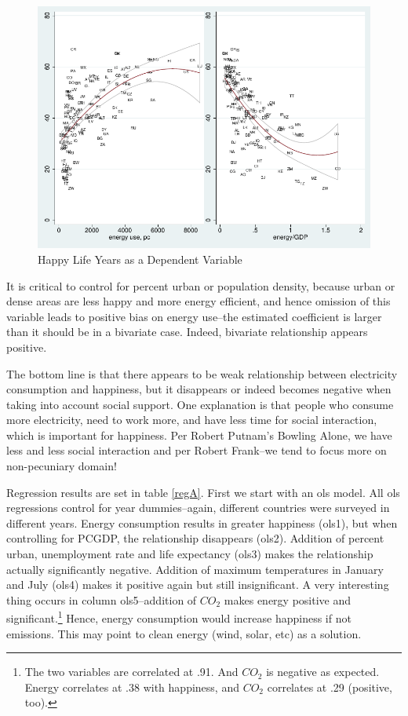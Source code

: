 \documentclass[10pt, letterpaper]{article}
\begin{document}
\begin{spacing}{1.4}
\begin{figure}[H]
 \includegraphics[width=6in]{graphsAndTables/couWdhEneGdpHly.pdf}\centering
\caption{Happy Life Years as a Dependent Variable}\label{hly}
\end{figure}

It is critical to control for percent urban or population density, because
urban or dense areas are less happy and more energy efficient, and hence
omission of this variable leads to positive bias on energy use--the estimated
coefficient   is larger than it should be in a bivariate case. Indeed, bivariate
relationship appears positive. 

The bottom line is that there appears to be weak relationship between electricity
consumption and happiness, but it disappears or indeed becomes negative when
taking into account social support. One explanation is that people who consume
more electricity, need to work more, and have less time for social interaction, which
is important for happiness. Per Robert Putnam's Bowling Alone, we have less and
less social interaction and per Robert Frank--we tend to  focus more on non-pecuniary domain!

Regression results are set in table \ref{regA}. First we start with an ols
model. All ols regressions control for year dummies--again, different countries
were surveyed in different years. Energy consumption results in greater
happiness (ols1), but when controlling for PCGDP, the relationship disappears
(ols2). Addition of percent urban, unemployment rate and life expectancy (ols3)
makes the relationship actually significantly negative.  Addition of maximum
temperatures in January and July (ols4) makes it positive again but still
insignificant.  A very interesting thing occurs in column ols5--addition of
$CO_2$ makes energy positive and significant.\footnote{The two variables are
  correlated at .91. And $CO_2$ is negative as expected. Energy correlates at .38
  with happiness, and $CO_2$ correlates at .29 (positive, too).}
 Hence, energy consumption would increase happiness if not emissions. This may
 point to clean energy (wind, solar, etc) as a solution. 


\end{spacing}
\end{document}
